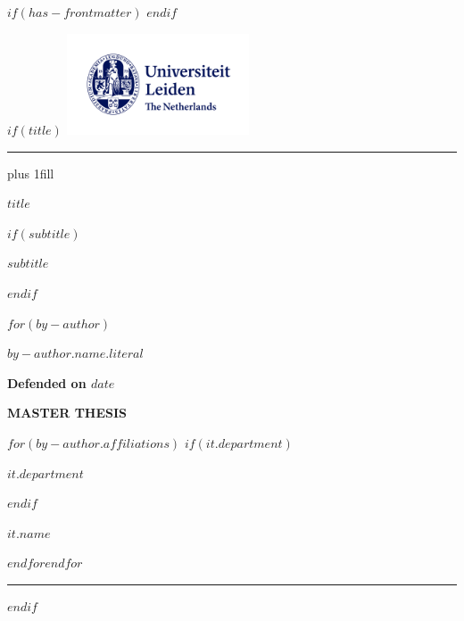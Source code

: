 $if(has-frontmatter)$
\frontmatter
$endif$



$if(title)$
\cleardoublepage
\thispagestyle{empty}
\includegraphics[width=\textwidth, height = 3cm]{images/ul.logo.png} 

\vspace{2pt}\vspace{-\baselineskip} %
	\rule{\textwidth}{0.4pt}\par %
{\centering
\hbox{}\vskip 0cm plus 1fill
{\Huge\bfseries $title$ \par}
$if(subtitle)$
\vspace{3ex}
{\Large\bfseries $subtitle$ \par}
$endif$

\vspace{12ex}

$for(by-author)$
{\Large\bfseries $by-author.name.literal$ \par}
\vspace{3ex}


{\bfseries\large Defended on $date$ \par}
\vspace{12ex}

{\bfseries\large MASTER THESIS \par}
\vspace{3ex}
$for(by-author.affiliations)$%
$if(it.department)$%
{\bfseries\large $it.department$ \par}
\vspace{3ex}
$endif$%
{\bfseries\large $it.name$ \par}
$endfor$$endfor$%
}
\vspace{12ex}
\vspace{2pt}\vspace{-\baselineskip} %
	\rule{\textwidth}{1pt}\par %
	
$endif$